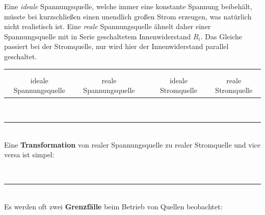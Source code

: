 \documentclass{article}
\begin{document}
\begin{mdframed}
\vspace{0.2\baselineskip}
\justify
Eine \textit{ideale} Spannungsquelle, welche immer eine konstante Spannung beibehält, müsste bei kurzschließen einen unendlich großen Strom erzeugen, was natürlich nicht realistisch ist. Eine \textit{reale} Spannungsquelle ähnelt daher einer Spannungsquelle mit in Serie geschaltetem Innenwiderstand $R_i$. Das Gleiche passiert bei der Stromquelle, nur wird hier der Innenwiderstand parallel geschaltet.
\par\centering
\vspace{0.6\baselineskip}
\begin{tabular}{ccccc}
    \raisebox{-0.5\height}{} & \raisebox{-0.5\height}{} &
    \begin{minipage}{1.5cm}\hspace{1.5cm}\end{minipage}&
    \raisebox{-0.5\height}{} & 
    \raisebox{-0.5\height}{}\\\\
    ideale Spannungsquelle & reale Spannungsquelle & & ideale Stromquelle & reale Stromquelle
\end{tabular}\\
\vspace{0.5\baselineskip}
\rule{0.6\textwidth}{0.5pt}\\
\vspace{0.5\baselineskip}
Eine \textbf{Transformation} von realer Spannungsquelle zu realer Stromquelle und vice versa ist simpel:
\begin{minipage}{0.8\textwidth}
\vspace{1\baselineskip}
\centering\raisebox{-0.5\height}{}
\end{minipage}\\
\vspace{0.5\baselineskip}
\rule{0.6\textwidth}{0.5pt}\\
\vspace{0.5\baselineskip}
Es werden oft zwei \textbf{Grenzfälle} beim Betrieb von Quellen beobachtet:
\vspace{1\baselineskip}


\end{mdframed}
\end{document}
